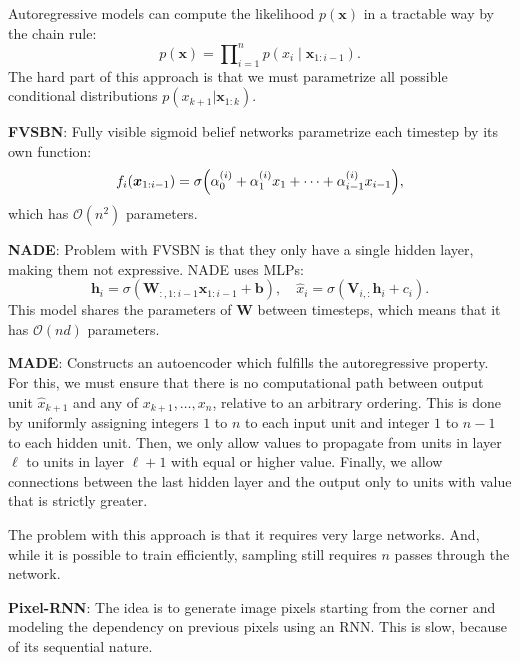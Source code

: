 \documentclass{article}
\newcommand{\lft}{\mathopen{}\mathclose\bgroup\left}
\newcommand{\rgt}{\aftergroup\egroup\right}
\renewcommand{\vec}[1]{\bm{#1}}
\newcommand{\mat}[1]{\bm{#1}}
\newenvironment{topic}[1]
{\textbf{\sffamily \colorbox{black}{\rlap{\textbf{\textcolor{white}{#1}}}\hspace{\linewidth}\hspace{-2\fboxsep}}} \\ \vspace{0.2cm}}
{}
\begin{document}
\begin{multicols*}{2}
\begin{topic}{Autoencoders}
    \end{topic}

    \begin{topic}{Autoregressive models}

        Autoregressive models can compute the likelihood $p(\vec{x})$ in a tractable way by the chain rule: \[
            p(\vec{x}) = \prod\nolimits_{i=1}^n p(x_i \mid \vec{x}_{1:i-1}).
        \]
        The hard part of this approach is that we must parametrize all possible conditional distributions
        $p(x_{k+1} | \vec{x}_{1:k})$.

        \textbf{FVSBN}: Fully visible sigmoid belief networks parametrize each timestep by its own function: \[
            f_i(\vec{x}_{1:i-1}) = \sigma \lft( \alpha_0^{(i)} + \alpha_1^{(i)} x_1 + \cdots + \alpha_{i-1}^{(i)} x_{i-1} \rgt),
        \]
        which has $\mathcal{O}(n^2)$ parameters.

        \textbf{NADE}: Problem with FVSBN is that they only have a single hidden layer, making them
        not expressive. NADE uses MLPs: \[
            \vec{h}_i = \sigma(\mat{W}_{:,1:i-1} \vec{x}_{1:i-1} + \vec{b}), \quad \hat{x}_i = \sigma(\mat{V}_{i,:} \vec{h}_i + c_i).
        \]
        This model shares the parameters of $\mat{W}$ between timesteps, which means that it has
        $\mathcal{O}(nd)$ parameters.

        \textbf{MADE}: Constructs an autoencoder which fulfills the autoregressive property. For this,
        we must ensure that there is no computational path between output unit $\hat{x}_{k+1}$ and
        any of $x_{k+1}, \ldots, x_n$, relative to an
        arbitrary ordering. This is done by uniformly assigning integers $1$ to $n$ to each input
        unit and integer $1$ to $n-1$ to each hidden unit. Then, we only allow values to propagate
        from units in layer $\ell$ to units in layer $\ell+1$ with equal or higher value. Finally,
        we allow connections between the last hidden layer and the output only to units with value
        that is strictly greater.

        The problem with this approach is that it requires very large networks. And, while it is possible
        to train efficiently, sampling still requires $n$ passes through the network.

        \textbf{Pixel-RNN}: The idea is to generate image pixels starting from the corner and
        modeling the dependency on previous pixels using an RNN. This is slow, because of its
        sequential nature.


\end{topic}
\end{multicols*}
\end{document}
